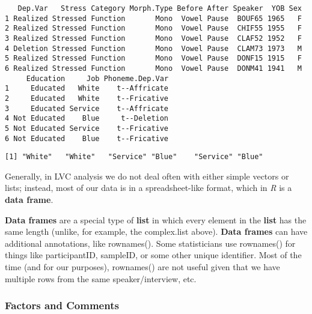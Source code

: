 \documentclass[
  10pt,
  letterpaper]{article}
\newenvironment{Shaded}{\begin{snugshade}}{\end{snugshade}}
\newcommand{\FunctionTok}[1]{\textcolor[rgb]{0.28,0.35,0.67}{#1}}
\newcommand{\NormalTok}[1]{\textcolor[rgb]{0.00,0.23,0.31}{#1}}
\newcommand{\SpecialCharTok}[1]{\textcolor[rgb]{0.37,0.37,0.37}{#1}}
\renewcommand\texttt[1]{{\ttfamily\color{BrickRed}#1}}
\begin{document}
\begin{verbatim}
   Dep.Var   Stress Category Morph.Type Before After Speaker  YOB Sex
1 Realized Stressed Function       Mono  Vowel Pause  BOUF65 1965   F
2 Realized Stressed Function       Mono  Vowel Pause  CHIF55 1955   F
3 Realized Stressed Function       Mono  Vowel Pause  CLAF52 1952   F
4 Deletion Stressed Function       Mono  Vowel Pause  CLAM73 1973   M
5 Realized Stressed Function       Mono  Vowel Pause  DONF15 1915   F
6 Realized Stressed Function       Mono  Vowel Pause  DONM41 1941   M
     Education     Job Phoneme.Dep.Var
1     Educated   White    t--Affricate
2     Educated   White    t--Fricative
3     Educated Service    t--Affricate
4 Not Educated    Blue     t--Deletion
5 Not Educated Service    t--Fricative
6 Not Educated    Blue    t--Fricative
\end{verbatim}

\begin{Shaded}
\end{Shaded}

\begin{verbatim}
[1] "White"   "White"   "Service" "Blue"    "Service" "Blue"   
\end{verbatim}

Generally, in LVC analysis we do not deal often with either simple
vectors or lists; instead, most of our data is in a spreadsheet-like
format, which in \emph{R} is a \textbf{data frame}.

\textbf{Data frames} are a special type of \textbf{list} in which every
element in the \textbf{list} has the same length (unlike, for example,
the \texttt{complex.list} above). \textbf{Data frames} can have
additional annotations, like \texttt{rownames()}. Some statisticians use
\texttt{rownames()} for things like \texttt{participantID},
\texttt{sampleID}, or some other unique identifier. Most of the time
(and for our purposes), \texttt{rownames()} are not useful given that we
have multiple rows from the same speaker/interview, etc.

\hypertarget{factors-and-comments}{%
\subsubsection{Factors and Comments}\label{factors-and-comments}}
\end{document}
